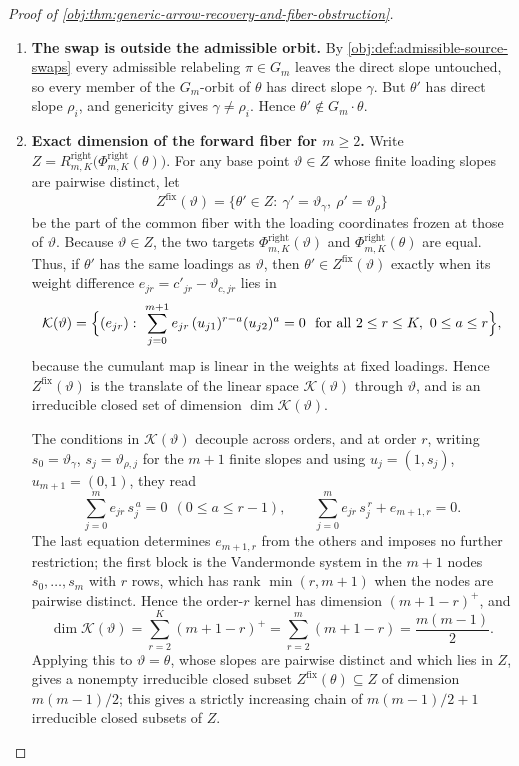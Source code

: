 \documentclass[11pt]{article}
\begin{document}
\begin{proof}[Proof of \cref{obj:thm:generic-arrow-recovery-and-fiber-obstruction}]
\begin{enumerate}
\item \textbf{The swap is outside the admissible orbit.}  By \cref{obj:def:admissible-source-swaps} every admissible relabeling \(\pi\in G_m\) leaves the direct slope untouched, so every member of the \(G_m\)-orbit of \(\theta\) has direct slope \(\gamma\).  But \(\theta'\) has direct slope \(\rho_i\), and genericity gives \(\gamma\ne\rho_i\).  Hence \(\theta'\notin G_m\cdot\theta\).

\item \textbf{Exact dimension of the forward fiber for \(m\ge2\).}  Write \(Z=R^{\mathrm{right}}_{m,K}\bigl(\Phi^{\mathrm{right}}_{m,K}(\theta)\bigr)\).  For any base point \(\vartheta\in Z\) whose finite loading slopes are pairwise distinct, let
\[
Z^{\mathrm{fix}}(\vartheta)=\{\theta'\in Z:\ \gamma'=\vartheta_\gamma,\ \rho'=\vartheta_\rho\}
\]
be the part of the common fiber with the loading coordinates frozen at those of \(\vartheta\).  Because \(\vartheta\in Z\), the two targets \(\Phi^{\mathrm{right}}_{m,K}(\vartheta)\) and \(\Phi^{\mathrm{right}}_{m,K}(\theta)\) are equal.  Thus, if \(\theta'\) has the same loadings as \(\vartheta\), then \(\theta'\in Z^{\mathrm{fix}}(\vartheta)\) exactly when its weight difference \(e_{jr}=c'_{jr}-\vartheta_{c,jr}\) lies in
\[
\mathcal K(\vartheta)=\Bigl\{(e_{jr}):\ \sum_{j=0}^{m+1}e_{jr}\,(u_{j1})^{r-a}(u_{j2})^{a}=0
\ \ \text{for all }2\le r\le K,\ 0\le a\le r\Bigr\},
\]
because the cumulant map is linear in the weights at fixed loadings.  Hence \(Z^{\mathrm{fix}}(\vartheta)\) is the translate of the linear space \(\mathcal K(\vartheta)\) through \(\vartheta\), and is an irreducible closed set of dimension \(\dim\mathcal K(\vartheta)\).

The conditions in \(\mathcal K(\vartheta)\) decouple across orders, and at order \(r\), writing \(s_0=\vartheta_\gamma\), \(s_j=\vartheta_{\rho,j}\) for the \(m+1\) finite slopes and using \(u_j=(1,s_j)\), \(u_{m+1}=(0,1)\), they read
\[
\sum_{j=0}^{m}e_{jr}\,s_j^{\,a}=0\ \ (0\le a\le r-1),
\qquad
\sum_{j=0}^{m}e_{jr}\,s_j^{\,r}+e_{m+1,r}=0 .
\]
The last equation determines \(e_{m+1,r}\) from the others and imposes no further restriction; the first block is the Vandermonde system in the \(m+1\) nodes \(s_0,\ldots,s_m\) with \(r\) rows, which has rank \(\min(r,m+1)\) when the nodes are pairwise distinct.  Hence the order-\(r\) kernel has dimension \((m+1-r)^{+}\), and
\[
\dim\mathcal K(\vartheta)=\sum_{r=2}^{K}(m+1-r)^{+}=\sum_{r=2}^{m}(m+1-r)=\frac{m(m-1)}2 .
\]
Applying this to \(\vartheta=\theta\), whose slopes are pairwise distinct and which lies in \(Z\), gives a nonempty irreducible closed subset \(Z^{\mathrm{fix}}(\theta)\subseteq Z\) of dimension \(m(m-1)/2\); this gives a strictly increasing chain of \(m(m-1)/2+1\) irreducible closed subsets of \(Z\).


\end{enumerate}
\end{proof}
\end{document}
